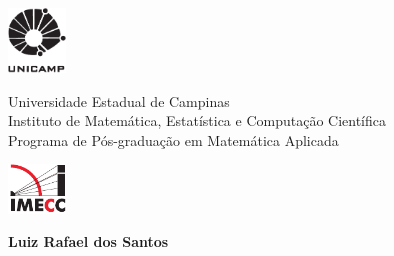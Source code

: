 \begin{titlepage}
  \thispagestyle{empty}
\noindent {\rule[-1ex]{16cm}{0.05cm}}
\begin{center}
\begin{minipage}[s]{1.5cm}
\includegraphics[width=0.6in]{figuras/unicamp.pdf}
\end{minipage}\begin{minipage}[s]{11cm}\noindent
{\begin{center} {\sffamily \Large Universidade Estadual de Campinas }\\ 
{ \sffamily Instituto de
Matem\'atica, Estat\'istica e Computa\c c\~ao Cient\'ifica}\protect \\
{\sffamily Programa de Pós-graduação em Matem\'atica Aplicada}
\end{center}}
\end{minipage}
\begin{minipage}[s]{1.5cm} 
\includegraphics[width=0.6in]{figuras/logo.pdf}
\end{minipage} 
\end{center}
\noindent{\rule[.2ex]{16cm}{0.03cm}}

\vspace{2cm} 

\begin{center}
\end{center}

\begin{center} 
  
\normalsize \vspace{10mm}

\setcounter{footnote}{1} \vspace{15mm} 
\renewcommand{\thefootnote}{\fnsymbol{footnote}}
{\Large {\bfseries \sffamily Luiz Rafael dos Santos}}


\end{center}
\end{titlepage}
